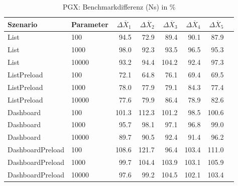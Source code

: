 
\begin{table}[ht]
\setlength{\extrarowheight}{-1pt}
\centering
\caption{PGX: Benchmarkdifferenz (Ns) in \%}
\begin{tabular}{llrrrrrr}
\toprule
Szenario & Parameter & ${\Delta \overline{X}_1}$ & ${\Delta \overline{X}_2}$ & ${\Delta \overline{X}_3}$ & ${\Delta \overline{X}_4}$ & ${\Delta \overline{X}_5}$ \\
\midrule
	List & 100 & \cellcolor{green!12}  94.5 & \cellcolor{green!21}  72.9 & \cellcolor{green!14}  89.4 & \cellcolor{green!14}  90.1 & \cellcolor{green!15}  87.9 \\
	List & 1000 &  98.0 & \cellcolor{green!13}  92.3 & \cellcolor{green!13}  93.5 & \cellcolor{green!11}  96.5 & \cellcolor{green!12}  95.3 \\
	List & 10000 & \cellcolor{green!13}  93.2 & \cellcolor{green!12}  94.4 & \cellcolor{red!12}  104.2 & \cellcolor{green!13}  92.4 & \cellcolor{green!11}  97.3 \\
	ListPreload & 100 & \cellcolor{green!21}  72.1 & \cellcolor{green!24}  64.8 & \cellcolor{green!20}  76.1 & \cellcolor{green!22}  69.4 & \cellcolor{green!22}  69.5 \\
	ListPreload & 1000 & \cellcolor{green!19}  78.0 & \cellcolor{green!19}  77.9 & \cellcolor{green!18}  79.1 & \cellcolor{green!16}  84.3 & \cellcolor{green!19}  77.4 \\
	ListPreload & 10000 & \cellcolor{green!19}  77.6 & \cellcolor{green!18}  79.9 & \cellcolor{green!15}  86.4 & \cellcolor{green!18}  78.9 & \cellcolor{green!17}  82.6 \\
	Dashboard & 100 &  101.3 & \cellcolor{red!15}  112.3 &  101.2 &  98.5 &  100.6 \\
	Dashboard & 1000 & \cellcolor{green!12}  95.7 &  98.1 & \cellcolor{green!11}  97.1 & \cellcolor{green!11}  96.8 &  99.0 \\
	Dashboard & 10000 & \cellcolor{green!14}  89.7 & \cellcolor{green!14}  90.5 & \cellcolor{green!13}  92.4 & \cellcolor{green!13}  91.4 & \cellcolor{green!12}  96.2 \\
	DashboardPreload & 100 & \cellcolor{red!13}  108.6 & \cellcolor{red!19}  121.7 & \cellcolor{green!11}  96.4 & \cellcolor{red!11}  103.4 & \cellcolor{red!14}  111.0 \\
	DashboardPreload & 1000 &  99.7 & \cellcolor{red!12}  104.4 & \cellcolor{red!12}  103.9 & \cellcolor{red!11}  103.1 & \cellcolor{red!12}  105.9 \\
	DashboardPreload & 10000 & \cellcolor{green!11}  97.6 &  99.2 & \cellcolor{red!12}  104.5 & \cellcolor{red!11}  102.1 & \cellcolor{red!11}  103.4 \\
\bottomrule
\end{tabular}
\label{tab:benchmarkdifferenz_pgx_ns}
\end{table}
	